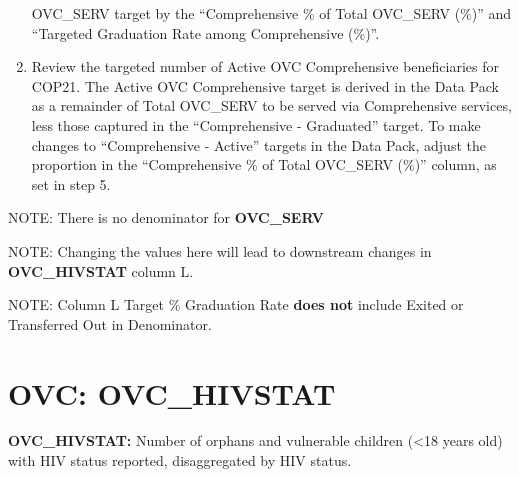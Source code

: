 \documentclass[
  openany]{book}
\begin{document}
\begin{enumerate}
  OVC\_SERV target by the ``Comprehensive \% of Total OVC\_SERV (\%)'' and
  ``Targeted Graduation Rate among Comprehensive (\%)''.
\item
  Review the targeted number of Active OVC Comprehensive beneficiaries
  for COP21. The Active OVC Comprehensive target is derived in the
  Data Pack as a remainder of Total OVC\_SERV to be served via
  Comprehensive services, less those captured in the ``Comprehensive -
  Graduated'' target. To make changes to ``Comprehensive - Active''
  targets in the Data Pack, adjust the proportion in the
  ``Comprehensive \% of Total OVC\_SERV (\%)'' column, as set in step 5.
\end{enumerate}

NOTE: There is no denominator for \textbf{OVC\_SERV}

NOTE: Changing the values here will lead to downstream changes in
\textbf{OVC\_HIVSTAT} column L.

NOTE: Column L Target \% Graduation Rate \textbf{does not} include Exited or
Transferred Out in Denominator.

\textbf{\emph{\hfill\break
}}

\hypertarget{ovc-ovc_hivstat}{%
\section{OVC: OVC\_HIVSTAT}\label{ovc-ovc_hivstat}}

\textbf{OVC\_HIVSTAT:} Number of orphans and vulnerable children (\textless18 years
old) with HIV status reported, disaggregated by HIV status.

\begin{table}[H]
\centering\begingroup\fontsize{12}{14}\selectfont

\endgroup{}
\end{table}
\end{document}
